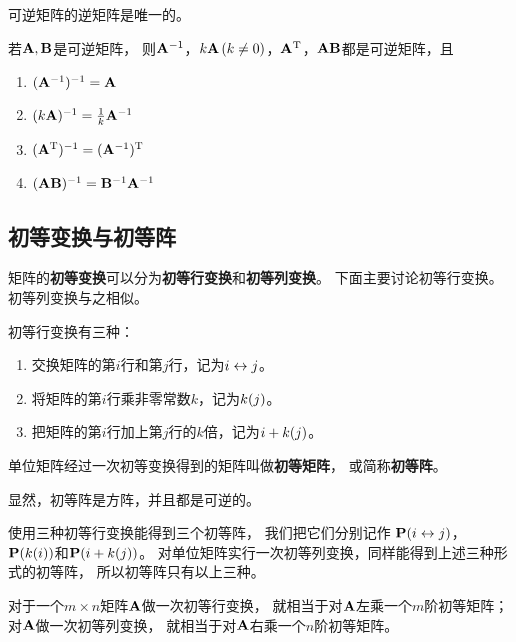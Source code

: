 \begin{theorem}[逆矩阵的唯一性]
  可逆矩阵的逆矩阵是唯一的。
\end{theorem}

\begin{theorem}[可逆矩阵的性质]
  若$\mathbf{A},\mathbf{B}$是可逆矩阵，
  则$\mathbf{A}^{-1}$，$k\mathbf{A}\,(k\neq 0)$，$\mathbf{A}^{\textrm{T}}$，$\mathbf{A}\mathbf{B}$都是可逆矩阵，且
  \begin{enumerate}
    \item $(\mathbf{A}^{-1})^{-1} = \mathbf{A}$
    \item $(k\mathbf{A})^{-1} = \frac{1}{k}\mathbf{A}^{-1}$
    \item $(\mathbf{A}^{\textrm{T}})^{-1} = (\mathbf{A}^{-1})^{\textrm{T}}$
    \item $(\mathbf{A}\mathbf{B})^{-1} = \mathbf{B}^{-1}\mathbf{A}^{-1}$
  \end{enumerate}
\end{theorem}

\subsection{初等变换与初等阵}
矩阵的\textbf{初等变换}可以分为\textbf{初等行变换}和\textbf{初等列变换}。
下面主要讨论初等行变换。初等列变换与之相似。

\begin{definition}[初等行变换]
  初等行变换有三种：
  \begin{enumerate}
    \item 交换矩阵的第$i$行和第$j$行，记为$i \leftrightarrow j$。
    \item 将矩阵的第$i$行乘非零常数$k$，记为$k(j)$。
    \item 把矩阵的第$i$行加上第$j$行的$k$倍，记为$i +k (j)$。
  \end{enumerate}
\end{definition}

\begin{definition}[初等阵]
  单位矩阵经过一次初等变换得到的矩阵叫做\textbf{初等矩阵}，
  或简称\textbf{初等阵}。
\end{definition}

\begin{remark}
  显然，初等阵是方阵，并且都是可逆的。
\end{remark}

使用三种初等行变换能得到三个初等阵，
我们把它们分别记作
$\mathbf{P}(i \leftrightarrow j)$，$\mathbf{P}(k(i))$和$\mathbf{P}(i +k (j))$。
对单位矩阵实行一次初等列变换，同样能得到上述三种形式的初等阵，
所以初等阵只有以上三种。

\begin{theorem}[一般矩阵的初等变换与初等阵的联系]
  对于一个$m\times n$矩阵$\mathbf{A}$做一次初等行变换，
  就相当于对$\mathbf{A}$左乘一个$m$阶初等矩阵；
  对$\mathbf{A}$做一次初等列变换，
  就相当于对$\mathbf{A}$右乘一个$n$阶初等矩阵。
\end{theorem}

